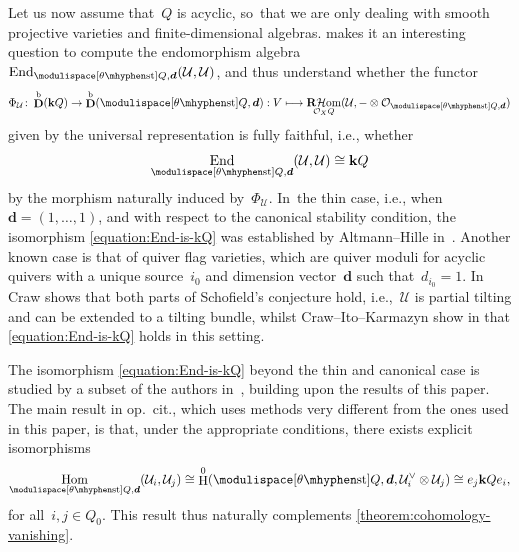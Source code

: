 \documentclass[JEP,XML,SOM,Unicode,NoEqCountersInSection,published]{cedram}
\newcommand\mto{\mathchoice{\longmapsto}{\mapsto}{\mapsto}{\mapsto}}
\theoremstyle{plain}
\theoremstyle{definition}
\DeclareMathOperator\derived{\mathbf{D}}
\DeclareMathOperator\End{End}
\DeclareMathOperator\HH{H}
\DeclareMathOperator\Hom{Hom}
\DeclareMathOperator\RsheafHom{\mathbf{R}\mathcal{H}om}
\newcommand\bounded{\ensuremath{\mathrm{b}}}
\newcommand\field{\mathbf{k}}
\newcommand\stable{\ensuremath{\mhyphen\mathrm{st}}}
\newcommand\tuple[1]{\ensuremath{{\boldsymbol{#1}}}}
\begin{document}
Let us now assume that~$Q$ is acyclic, so~that we are only dealing with smooth projective varieties
and finite-dimensional algebras.
 makes it an interesting question to
compute the endomorphism algebra~$\End_{\modulispace[\theta\stable]{Q,\tuple{d}}}(\mathcal{U},\mathcal{U})$,
and thus understand whether the functor
\begin{equation}
\label{equation:fully-faithful-functor}
\Phi_{\mathcal{U}}\colon
\derived^\bounded(\field Q)\to\derived^\bounded(\modulispace[\theta\stable]{Q,\tuple{d}}):
V\mto\RsheafHom_{\mathcal{O}_XQ}(\mathcal{U},-\otimes\mathcal{O}_{\modulispace[\theta\stable]{Q,\tuple{d}}})
\end{equation}
given by the universal representation is fully faithful,
i.e.,
whether
\begin{equation}
\label{equation:End-is-kQ}
\End_{\modulispace[\theta\stable]{Q,\tuple{d}}}(\mathcal{U},\mathcal{U})
\cong
\field Q
\end{equation}
by the morphism naturally induced by~$\Phi_{\mathcal{U}}$. In~the thin case,
i.e.,
when~$\tuple{d}=(1,\ldots,1)$,
and with respect to the canonical stability condition,
the isomorphism \eqref{equation:End-is-kQ} was established by Altmann--Hille in~\cite[Th.\,1.3]{MR1688469}.
Another known case is that of quiver flag varieties,
which are quiver moduli for acyclic quivers with a unique source~$i_0$
and dimension vector~$\tuple{d}$ such that~$d_{i_0}=1$. In~\cite[Th.\,1.2]{MR2772068} Craw shows that both parts of Schofield's conjecture hold,
i.e.,~$\mathcal{U}$ is partial tilting and can be extended to a tilting bundle,
whilst Craw--Ito--Karmazyn show in \cite[Ex.\,2.9]{MR3803802}
that \eqref{equation:End-is-kQ} holds in this setting.

The isomorphism \eqref{equation:End-is-kQ}
beyond the thin and canonical case
is studied by a subset of the authors in~\cite{MR4883104},
building upon the results of this paper.
The main result in op.~cit.,
which uses methods very different from the ones used in this paper,
is that,
under the appropriate conditions,
there exists explicit isomorphisms
\begin{equation*}
\Hom_{\modulispace[\theta\stable]{Q,\tuple{d}}}(\mathcal{U}_i,\mathcal{U}_j)
\cong
\HH^0(\modulispace[\theta\stable]{Q,\tuple{d}},\mathcal{U}_i^\vee\otimes\mathcal{U}_j)
\cong
e_j\field Qe_i,
\end{equation*}
for all~$i,j\in Q_0$.
This result thus naturally complements \cref{theorem:cohomology-vanishing}.
\end{document}
